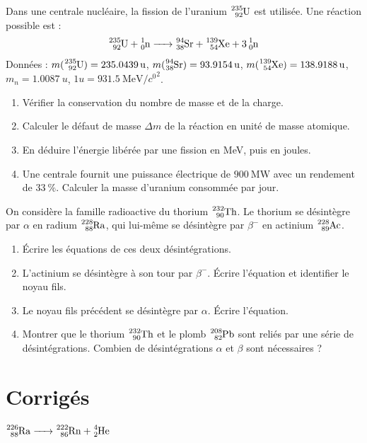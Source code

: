 Dans une centrale nucléaire, la fission de l'uranium $\ce{^{235}_{92}U}$ est utilisée. Une réaction possible est :
\[\ce{^{235}_{92}U + ^{1}_{0}n -> ^{94}_{38}Sr + ^{139}_{54}Xe + 3 ^{1}_{0}n}\]
Données : $m(\ce{^{235}_{92}U}) = \SI{235.0439}{u}$, $m(\ce{^{94}_{38}Sr}) = \SI{93.9154}{u}$, $m(\ce{^{139}_{54}Xe}) = \SI{138.9188}{u}$, $m_n = \SI{1.0087}{u}$, $1 u = \SI{931.5}{\MeV\per\clight\squared}$.

\begin{enumerate}[label=\arabic*)]
    \item Vérifier la conservation du nombre de masse et de la charge.
    \item Calculer le défaut de masse $\Delta m$ de la réaction en unité de masse atomique.
    \item En déduire l'énergie libérée par une fission en MeV, puis en joules.
    \item Une centrale fournit une puissance électrique de $\SI{900}{\mega\watt}$ avec un rendement de $\SI{33}{\percent}$. Calculer la masse d'uranium consommée par jour.
\end{enumerate}

On considère la famille radioactive du thorium $\ce{^{232}_{90}Th}$. Le thorium se désintègre par $\alpha$ en radium $\ce{^{228}_{88}Ra}$, qui lui-même se désintègre par $\beta^-$ en actinium $\ce{^{228}_{89}Ac}$.

\begin{enumerate}[label=\arabic*)]
    \item Écrire les équations de ces deux désintégrations.
    \item L'actinium se désintègre à son tour par $\beta^-$. Écrire l'équation et identifier le noyau fils.
    \item Le noyau fils précédent se désintègre par $\alpha$. Écrire l'équation.
    \item Montrer que le thorium $\ce{^{232}_{90}Th}$ et le plomb $\ce{^{208}_{82}Pb}$ sont reliés par une série de désintégrations. Combien de désintégrations $\alpha$ et $\beta$ sont nécessaires ?
\end{enumerate}

\section{Corrigés}

$\ce{^{226}_{88}Ra -> ^{222}_{86}Rn + ^{4}_{2}He}$

